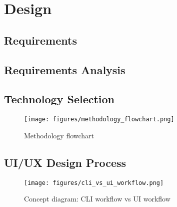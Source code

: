 \chapter{Design} %
\label{chap:design}


\section{Requirements}

\section{Requirements Analysis}

\section{Technology Selection}

\begin{figure}[H]
    \centering
    \texttt{[image: figures/methodology\_flowchart.png]}
    \caption{Methodology flowchart}
\end{figure}

\section{UI/UX Design Process}

\begin{figure}[H]
    \centering
    \texttt{[image: figures/cli\_vs\_ui\_workflow.png]}
    \caption{Concept diagram: CLI workflow vs UI workflow}
\end{figure}

